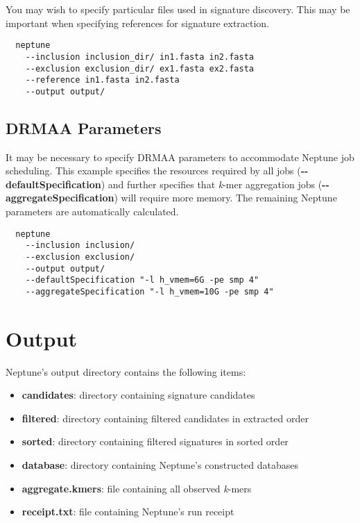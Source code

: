 \documentclass[a4paper,10pt]{article}
\begin{document}
You may wish to specify particular files used in signature discovery. This may be important when specifying references for signature extraction.

\begin{verbatim}
  neptune
    --inclusion inclusion_dir/ in1.fasta in2.fasta
    --exclusion exclusion_dir/ ex1.fasta ex2.fasta
    --reference in1.fasta in2.fasta    
    --output output/
\end{verbatim}

\subsection{DRMAA Parameters}

It may be necessary to specify DRMAA parameters to accommodate Neptune job scheduling. This example specifies the resources required by all jobs (\mbox{\textbf{-{}-defaultSpecification}}) and further specifies that \textit{k}-mer aggregation jobs (\mbox{\textbf{-{}-aggregateSpecification}}) will require more memory. The remaining Neptune parameters are automatically calculated.

\begin{verbatim}
  neptune
    --inclusion inclusion/
    --exclusion exclusion/
    --output output/
    --defaultSpecification "-l h_vmem=6G -pe smp 4"
    --aggregateSpecification "-l h_vmem=10G -pe smp 4"
\end{verbatim}

\newpage
\section{Output}

Neptune's output directory contains the following items:

\begin{itemize}
  \item \textbf{candidates}: directory containing signature candidates
  \item \textbf{filtered}: directory containing filtered candidates in extracted order
  \item \textbf{sorted}: directory containing filtered signatures in sorted order
  \item \textbf{database}: directory containing Neptune's constructed databases
  \item \textbf{aggregate.kmers}: file containing all observed \textit{k}-mers
  \item \textbf{receipt.txt}: file containing Neptune's run receipt
\end{itemize}
\end{document}
